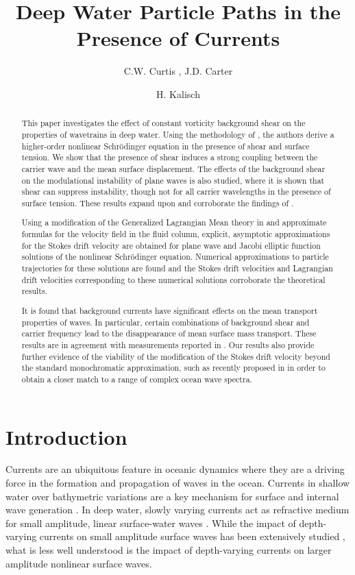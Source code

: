 \documentclass{JFM_Style/jfm}
\title{Deep Water Particle Paths in the Presence of Currents}
\date{}
\author{C.W. Curtis \aff{1}
  \corresp{\email{ccurtis@mail.sdsu.edu}}, J.D. Carter\aff{2} \and H. Kalisch\aff{3}}
\affiliation{\aff{1}Department of Mathematics and Statistics, San Diego State University, San Diego, CA 92182
\aff{2}Mathematics Department, Seattle University, Seattle, WA 98122
\aff{3}Department of Mathematics, University of Bergen, Bergen, Norway
}
\begin{document}
\maketitle

\begin{abstract}
This paper investigates the effect of constant vorticity background shear on the properties of wavetrains in deep water. Using the methodology of \cite{fokas2008},
the authors derive a higher-order nonlinear Schr\"{o}dinger equation in the presence of shear and surface tension.  We show that the presence of shear induces a strong coupling between the carrier wave and the mean surface displacement.  The effects of the background shear on the modulational instability of plane waves is also studied, where it is shown that shear can suppress instability, though not for all carrier wavelengths in the presence of surface tension.  These results expand upon and corroborate the findings of \cite{thomas2012nonlinear}.

Using a modification of the Generalized Lagrangian Mean theory in  \cite{andrews} and approximate formulas for the velocity field in the fluid column, explicit, asymptotic approximations for the Stokes drift velocity are obtained for plane wave and Jacobi elliptic function solutions of the nonlinear Schr\"odinger equation.  Numerical approximations to particle trajectories for these solutions are found and the Stokes drift velocities and Lagrangian drift velocities corresponding to these numerical solutions corroborate the theoretical results.  

It is found that background currents have significant effects on the mean transport properties of waves. In particular, certain combinations of background shear and carrier frequency lead to the disappearance of mean surface mass transport.  These results
are in agreement with measurements reported in \cite{smith}.  Our results also provide further evidence of the viability of the modification of the Stokes drift velocity beyond the standard monochromatic approximation, such as recently proposed in \cite{breivik} in order to obtain a closer match to a range of complex ocean wave spectra.
\end{abstract}

\section{Introduction}

Currents are an ubiquitous feature in oceanic dynamics where they are a driving force in the formation and propagation of waves in the ocean.  Currents in shallow water over bathymetric variations are a key mechanism for surface and internal wave generation \cite{helfrich}.  In deep water, slowly varying currents act as refractive medium for small amplitude, linear surface-water waves \cite{young}.  While the impact of depth-varying currents on small amplitude surface waves has been extensively studied \cite{craik1,craik2,craik3,craik4,phillips1,phillips2}, what is less well understood is the impact of depth-varying currents on larger amplitude nonlinear surface waves. 
\end{document}
